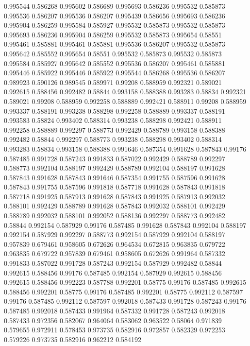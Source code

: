0.995544 0.586268
0.995602 0.586689
0.995693 0.586236
0.995532 0.585873
0.995536 0.586207
0.995536 0.586207
0.995439 0.586656
0.995693 0.586236
0.995904 0.586259
0.995584 0.585927
0.995532 0.585873
0.995532 0.585873
0.995693 0.586236
0.995904 0.586259
0.995532 0.585873
0.995654 0.58551
0.995461 0.585881
0.995461 0.585881
0.995536 0.586207
0.995532 0.585873
0.995642 0.585552
0.995654 0.58551
0.995532 0.585873
0.995532 0.585873
0.995584 0.585927
0.995642 0.585552
0.995536 0.586207
0.995461 0.585881
0.995446 0.585922
0.995446 0.585922
0.995544 0.586268
0.995536 0.586207
0.989923 0.590126
0.989545 0.589971
0.99208 0.588959
0.992321 0.589021
0.992615 0.588456
0.992482 0.58844
0.993158 0.588388
0.993283 0.58834
0.992321 0.589021
0.99208 0.588959
0.992258 0.588889
0.992421 0.588911
0.99208 0.588959
0.993337 0.588191
0.993238 0.588298
0.992258 0.588889
0.993337 0.588191
0.993583 0.58824
0.993402 0.588314
0.993238 0.588298
0.992421 0.588911
0.992258 0.588889
0.992297 0.588773
0.992429 0.588789
0.993158 0.588388
0.992482 0.58844
0.992297 0.588773
0.993238 0.588298
0.993402 0.588314
0.993283 0.58834
0.993158 0.588388
0.991646 0.587354
0.991628 0.587843
0.99176 0.587485
0.991728 0.587243
0.991833 0.587022
0.992429 0.588789
0.992297 0.588773
0.992104 0.588197
0.992429 0.588789
0.992104 0.588197
0.991628 0.587843
0.991628 0.587843
0.991646 0.587354
0.991755 0.587596
0.991628 0.587843
0.991755 0.587596
0.991818 0.587718
0.991628 0.587843
0.991818 0.587718
0.991925 0.587913
0.991628 0.587843
0.991925 0.587913
0.992032 0.588101
0.992429 0.588789
0.991628 0.587843
0.992032 0.588101
0.992429 0.588789
0.992032 0.588101
0.992052 0.588136
0.992297 0.588773
0.992482 0.58844
0.992154 0.587929
0.99176 0.587485
0.991628 0.587843
0.992104 0.588197
0.992154 0.587929
0.992297 0.588773
0.992154 0.587929
0.992104 0.588197
0.957839 0.679461
0.958605 0.672626
0.964534 0.672815
0.963835 0.679722
0.963835 0.679722
0.957839 0.679461
0.958605 0.672626
0.991964 0.587332
0.991833 0.587022
0.991728 0.587243
0.992154 0.587929
0.992482 0.58844
0.992615 0.588456
0.99176 0.587485
0.992154 0.587929
0.992615 0.588456
0.992615 0.588456
0.992223 0.587788
0.992201 0.58775
0.99176 0.587485
0.992615 0.588456
0.992201 0.58775
0.99176 0.587485
0.992201 0.58775
0.992112 0.587597
0.99176 0.587485
0.992112 0.587597
0.992018 0.587433
0.991728 0.587243
0.99176 0.587485
0.992018 0.587433
0.991964 0.587332
0.991728 0.587243
0.992018 0.587433
0.972356 0.582067
0.964064 0.583062
0.963522 0.58064
0.971839 0.579655
0.972911 0.578453
0.973735 0.582916
0.972857 0.582329
0.972253 0.579226
0.973735 0.582916
0.962212 0.584192

